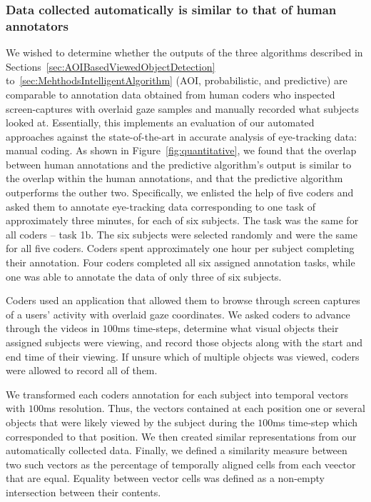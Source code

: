 \subsubsection{Data collected automatically is similar to that of human annotators}
\label{sec:EvalResults}


We wished to determine whether the outputs of the three algorithms described in Sections~\ref{sec:AOIBasedViewedObjectDetection} to~\ref{sec:MehthodsIntelligentAlgorithm} (AOI, probabilistic, and predictive) are comparable to annotation data obtained from human coders who inspected screen-captures with overlaid gaze samples and manually recorded what subjects looked at. Essentially, this implements an evaluation of our automated approaches against the state-of-the-art in accurate analysis of eye-tracking data: manual coding.  As shown in Figure~\ref{fig:quantitative}, we found that the overlap between human annotations and the predictive algorithm’s output is similar to the overlap within the human annotations, and that the predictive algorithm outperforms the outher two. 
Specifically, we enlisted the help of five coders and asked them to annotate eye-tracking data corresponding to one task of approximately three minutes, for each of six subjects.  The task was the same for all coders – task 1b. The six subjects were selected randomly and were the same for all five coders. Coders spent approximately one hour per subject completing their annotation. Four coders completed all six assigned annotation tasks, while one was able to annotate the data of only three of six subjects. 

Coders used an application that allowed them to browse through screen captures of a users' activity with overlaid gaze coordinates. We asked coders to advance through the videos in $100$ms time-steps, determine what visual objects their assigned subjects were viewing, and record those objects along with the start and end time of their viewing. If unsure which of multiple objects was viewed, coders were allowed to record all of them.  

We transformed each coders annotation for each subject into temporal vectors with $100$ms resolution. Thus, the vectors contained at each position one or several objects that were likely viewed by the subject during the $100$ms time-step which corresponded to that position. We then created similar representations from our automatically collected data. Finally, we defined a similarity measure between two such vectors as the percentage of temporally aligned cells from each veector that are equal. Equality between vector cells was defined as a non-empty intersection between their contents. 

